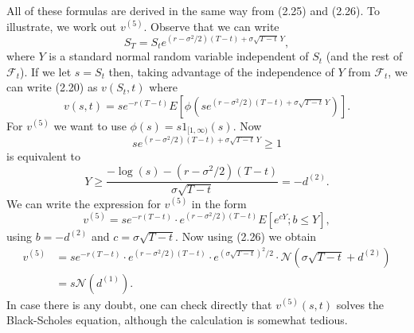 All of these formulas are derived in the same way from (2.25) and (2.26). To illustrate, we work out \(v^{(5)}\). Observe that we can write
\[
S_T = S_t e^{(r - \sigma^2/2)(T-t) + \sigma \sqrt{T-t} \, Y},
\]
where \(Y\) is a standard normal random variable independent of \(S_t\) (and the rest of \(\mathcal{F}_t\)). If we let \(s = S_t\) then, taking advantage of the independence of \(Y\) from \(\mathcal{F}_t\), we can write (2.20) as \(v(S_t,t)\) where
\[
v(s,t) = s e^{-r(T-t)} E[\phi(s e^{(r - \sigma^2/2)(T-t) + \sigma \sqrt{T-t} \, Y})].
\]
For \(v^{(5)}\) we want to use \(\phi(s) = s 1_{[1,\infty)}(s)\). Now
\[
s e^{(r - \sigma^2/2)(T-t) + \sigma \sqrt{T-t} \, Y} \geq 1
\]
is equivalent to
\[
Y \geq \frac{-\log(s) - (r - \sigma^2/2)(T-t)}{\sigma \sqrt{T-t}} = -d^{(2)}.
\]
We can write the expression for \(v^{(5)}\) in the form
\[
v^{(5)} = s e^{-r(T-t)} \cdot e^{(r - \sigma^2/2)(T-t)} E[e^{cY}; b \leq Y],
\]
using \(b = -d^{(2)}\) and \(c = \sigma \sqrt{T-t}\). Now using (2.26) we obtain
\begin{align*}
v^{(5)} &= s e^{-r(T-t)} \cdot e^{(r - \sigma^2/2)(T-t)} \cdot e^{(\sigma \sqrt{T-t})^2/2} \cdot \mathcal{N}(\sigma \sqrt{T-t} + d^{(2)}) \\
&= s \mathcal{N}(d^{(1)}).
\end{align*}
In case there is any doubt, one can check directly that \(v^{(5)}(s,t)\) solves the Black-Scholes equation, although the calculation is somewhat tedious.